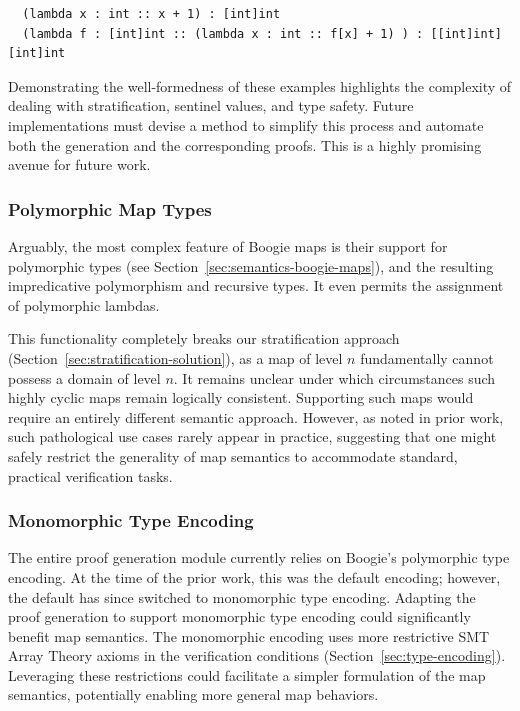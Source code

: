 \documentclass[11pt]{article}
\begin{document}
\begin{verbatim}
  (lambda x : int :: x + 1) : [int]int
  (lambda f : [int]int :: (lambda x : int :: f[x] + 1) ) : [[int]int][int]int
\end{verbatim}

Demonstrating the well-formedness of these examples highlights the complexity of dealing with stratification, sentinel values, and type safety.
Future implementations must devise a method to simplify this process and automate both the generation and the corresponding proofs.
This is a highly promising avenue for future work.

\subsubsection{Polymorphic Map Types}

Arguably, the most complex feature of Boogie maps is their support for polymorphic types (see Section~\ref{sec:semantics-boogie-maps}),
and the resulting impredicative polymorphism and recursive types.
It even permits the assignment of polymorphic lambdas.

This functionality completely breaks our stratification approach (Section~\ref{sec:stratification-solution}),
as a map of level $n$ fundamentally cannot possess a domain of level $n$.
It remains unclear under which circumstances such highly cyclic maps remain logically consistent.
Supporting such maps would require an entirely different semantic approach.
However, as noted in prior work, such pathological use cases rarely appear in practice,
suggesting that one might safely restrict the generality of map semantics to accommodate standard, practical verification tasks.

\subsubsection{Monomorphic Type Encoding}

The entire proof generation module currently relies on Boogie's polymorphic type encoding.
At the time of the prior work, this was the default encoding;
however, the default has since switched to monomorphic type encoding.
Adapting the proof generation to support monomorphic type encoding could significantly benefit map semantics.
The monomorphic encoding uses more restrictive SMT Array Theory axioms in the verification conditions (Section~\ref{sec:type-encoding}).
Leveraging these restrictions could facilitate a simpler formulation of the map semantics, potentially enabling more general map behaviors.
\end{document}
